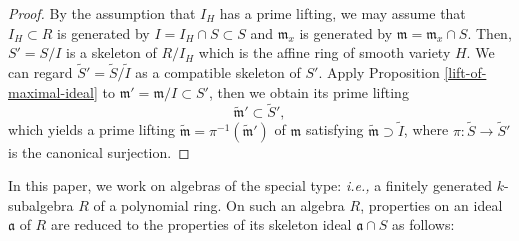 \documentclass[a4paper]{amsart}
\renewcommand{\a}{{\mathfrak{a}}}
\newcommand{\p}{{\mathfrak{p}}}
\renewcommand{\wp}{{\widetilde{\p}}}
\newcommand{\wI}{{\widetilde{I}}}
\newcommand{\m}{{\mathfrak{m}}}
\newcommand{\height}{{\mathrm{ht} }}
\newcommand{\tf}{{\tilde f}}
\newcommand{\ws}{{\widetilde{S}}}
\newcommand{\wm}{{\widetilde\m}}
\theoremstyle{definition}
\newtheorem{rem}[thm]{Remark}
\begin{document}
\begin{proof}
      By the assumption that $I_H$ has a prime lifting,
      we may assume that $I_H\subset R$ is generated by $I=I_H\cap S\subset S$
      and $\m_x$ is generated by $\m=\m_x\cap S$.
      Then, $S'=S/I$ is a skeleton of $R/I_H$ which is the affine ring of smooth variety $H$.
      We can regard $\ws'=\ws/\wI$ as a compatible skeleton of $S'$.
      Apply Proposition \ref{lift-of-maximal-ideal} to $\m'=\m/I\subset S'$,
      then we obtain its prime lifting 
      $$\wm' \subset \ws',$$
      which yields a prime lifting $\wm=\pi^{-1}(\wm')$ of $\m$ satisfying $\wm\supset \wI$,
      where $\pi: \ws\to \ws'$ is the canonical surjection.

\end{proof}


In this paper, we work on algebras of the special type: {\it i.e.,} a finitely generated $k$-subalgebra $R$ of a polynomial ring.
On such an algebra $R$, properties on an ideal $\a$ of $R$ are reduced to the properties of its skeleton ideal $\a\cap S$ as follows:
\end{document}
